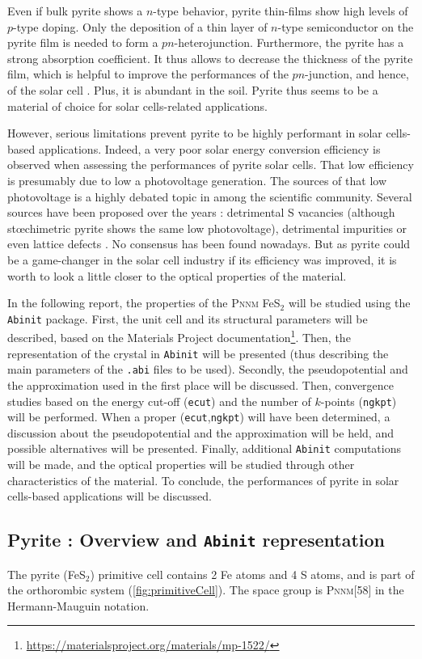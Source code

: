 \documentclass[11pt,a4paper]{article}
\begin{document}
Even if bulk pyrite shows a $n$-type behavior, pyrite thin-films show high levels of $p$-type doping. Only the deposition of a thin layer of $n$-type semiconductor on the pyrite film is needed to form a $pn$-heterojunction. Furthermore, the pyrite has a strong absorption coefficient. It thus allows to decrease the thickness of the pyrite film, which is helpful to improve the performances of the $pn$-junction, and hence, of the solar cell \cite{thinFilms}. Plus, it is abundant in the soil. Pyrite thus seems to be a material of choice for solar cells-related applications.

However, serious limitations prevent pyrite to be highly performant in solar cells-based applications. Indeed, a very poor solar energy conversion efficiency is observed when assessing the performances of pyrite solar cells. That low efficiency is presumably due to low a photovoltage generation. The sources of that low photovoltage is a highly debated topic in among the scientific community. Several sources have been proposed over the years : detrimental S vacancies (although stœchimetric pyrite shows the same low photovoltage), detrimental impurities or even lattice defects \cite{limitations}. No consensus has been found nowadays. But as pyrite could be a game-changer in the solar cell industry if its efficiency was improved, it is worth to look a little closer to the optical properties of the material.

In the following report, the properties of the \textsc{Pnnm} FeS$_2$ will be studied using the \texttt{Abinit} package. First, the unit cell and its structural parameters will be described, based on the Materials Project documentation\footnote{\url{https://materialsproject.org/materials/mp-1522/}}. Then, the representation of the crystal in \texttt{Abinit} will be presented (thus describing the main parameters of the \texttt{.abi} files to be used). Secondly, the pseudopotential and the approximation used in the first place will be discussed. Then, convergence studies based on the energy cut-off (\texttt{ecut}) and the number of $k$-points (\texttt{ngkpt}) will be performed. When a proper (\texttt{ecut},\texttt{ngkpt}) will have been determined, a discussion about the pseudopotential and the approximation will be held, and possible alternatives will be presented. Finally, additional \texttt{Abinit} computations will be made, and the optical properties will be studied through other characteristics of the material. To conclude, the performances of pyrite in solar cells-based applications will be discussed.
\subsection{Pyrite : Overview and \texttt{Abinit} representation}
The pyrite (FeS$_2$) primitive cell contains 2 Fe atoms and 4 S atoms, and is part of the orthorombic system (\autoref{fig:primitiveCell}). The space group is \textsc{Pnnm}[58] in the Hermann-Mauguin notation. 
\end{document}

